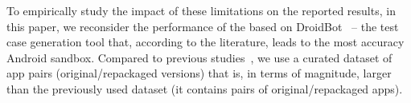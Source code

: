 
To empirically study the impact of these limitations on the reported results, in this paper, we reconsider the performance of the \mas based on DroidBot~\cite{DBLP:conf/icse/LiYGC17} -- the test case generation tool that, according to the literature, leads to the most accuracy Android sandbox. 
Compared to previous studies~\cite{DBLP:conf/wcre/BaoLL18,DBLP:conf/scam/CostaMCMVBC20},
we use a curated dataset of app pairs (original/repackaged versions) that is, in terms of magnitude, larger than the previously used dataset (it contains \apps pairs of original/repackaged apps).
 
